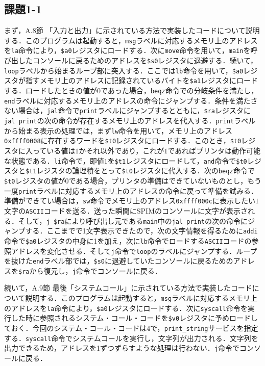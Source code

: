 \subsection{課題1-1}
まず，A.8節 「入力と出力」に示されている方法で実装したコードについて説明する．このプログラムは起動すると，\verb|msg|ラベルに対応するメモリ上のアドレスを\verb|la|命令により，\verb|$a0|レジスタにロードする．次に\verb|move|命令を用いて，\verb|main|を呼び出したコンソールに戻るためのアドレスを\verb|$s0|レジスタに退避する．続いて，\verb|loop|ラベルから始まるループ部に突入する．ここでは\verb|lb|命令を用いて，\verb|$a0|レジスタが指すメモリ上のアドレスに記録されているバイトを\verb|$a1|レジスタにロードする．ロードしたときの値が$0$であった場合，\verb|beqz|命令での分岐条件を満たし，\verb|end|ラベルに対応するメモリ上のアドレスの命令にジャンプする．条件を満たさない場合は，\verb|jal|命令で\verb|print|ラベルにジャンプするとともに，\verb|$ra|レジスタに\verb|jal print|の次の命令が存在するメモリ上のアドレスを代入する．\verb|print|ラベルから始まる表示の処理では，まず\verb|lw|命令を用いて，メモリ上のアドレス\verb|0xffff0008|に存在するワードを\verb|$t0|レジスタにロードする．このとき，\verb|$t0|レジスタに入っている値は$1$かそれ以外であり，これが$1$であればプリンタは動作可能な状態である．\verb|li|命令で，即値$1$を\verb|$t1|レジスタにロードして，\verb|and|命令で\verb|$t0|レジスタと\verb|$t1|レジスタの論理積をとって\verb|$t0|レジスタに代入する．次の\verb|beqz|命令で\verb|$t0|レジスタの値が$0$である場合，プリンタの準備はできていないものとし，もう一度\verb|print|ラベルに対応するメモリ上のアドレスの命令に戻って準備を試みる．準備ができてい場合は，\verb|sw|命令でメモリ上のアドレス\verb|0xffff000c|に表示したい$1$文字の\verb|ASCII|コードを送る．送った瞬間にSPIMのコンソールに文字が表示される．そして，\verb|j $ra|により呼び出し元である\verb|main|中の\verb|jal print|の次の命令にジャンプする．ここまでで1文字表示できたので，次の文字情報を得るために\verb|addi|命令で\verb|$a0|レジスタの中身に1を加え，次に\verb|lb|命令でロードする\verb|ASCII|コードの参照アドレスを変化させる．そして\verb|j|命令で\verb|loop|のラベルにジャンプする．ループを抜けた\verb|end|ラベル部では，\verb|$s0|に退避していたコンソールに戻るためのアドレスを\verb|$ra|から復元し，\verb|j|命令でコンソールに戻る．

続いて，A.9節 最後「システムコール」に示されている方法で実装したコードについて説明する．このプログラムは起動すると，\verb|msg|ラベルに対応するメモリ上のアドレスを\verb|la|命令により，\verb|$a0|レジスタにロードする．次に\verb|syscall|命令を実行した時に参照されるシステム・コール・コードを\verb|$v0|レジスタに予めロードしておく．今回のシステム・コール・コードは$4$で，\verb|print_string|サービスを指定する．\verb|syscall|命令でシステムコールを実行し，文字列が出力される．文字列を出力できるため，アドレスを1ずつずらすような処理は行わない．\verb|j|命令でコンソールに戻る．


